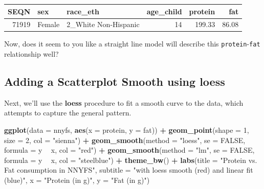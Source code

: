 \documentclass[
]{book}
\newenvironment{Shaded}{\begin{snugshade}}{\end{snugshade}}
\newcommand{\DataTypeTok}[1]{\textcolor[rgb]{0.13,0.29,0.53}{#1}}
\newcommand{\DecValTok}[1]{\textcolor[rgb]{0.00,0.00,0.81}{#1}}
\newcommand{\KeywordTok}[1]{\textcolor[rgb]{0.13,0.29,0.53}{\textbf{#1}}}
\newcommand{\NormalTok}[1]{#1}
\newcommand{\OperatorTok}[1]{\textcolor[rgb]{0.81,0.36,0.00}{\textbf{#1}}}
\newcommand{\OtherTok}[1]{\textcolor[rgb]{0.56,0.35,0.01}{#1}}
\newcommand{\StringTok}[1]{\textcolor[rgb]{0.31,0.60,0.02}{#1}}
\begin{document}
\begin{Shaded}
\end{Shaded}

\begin{tabular}{r|l|l|r|r|r}
\hline
SEQN & sex & race\_eth & age\_child & protein & fat\\
\hline
71919 & Female & 2\_White Non-Hispanic & 14 & 199.33 & 86.08\\
\hline
\end{tabular}

Now, does it seem to you like a straight line model will describe this \texttt{protein}-\texttt{fat} relationship well?

\hypertarget{adding-a-scatterplot-smooth-using-loess}{%
\subsection{Adding a Scatterplot Smooth using loess}\label{adding-a-scatterplot-smooth-using-loess}}

Next, we'll use the \textbf{loess} procedure to fit a smooth curve to the data, which attempts to capture the general pattern.

\begin{Shaded}
\begin{Highlighting}[]
\KeywordTok{ggplot}\NormalTok{(}\DataTypeTok{data =}\NormalTok{ nnyfs, }\KeywordTok{aes}\NormalTok{(}\DataTypeTok{x =}\NormalTok{ protein, }\DataTypeTok{y =}\NormalTok{ fat)) }\OperatorTok{+}
\StringTok{    }\KeywordTok{geom_point}\NormalTok{(}\DataTypeTok{shape =} \DecValTok{1}\NormalTok{, }\DataTypeTok{size =} \DecValTok{2}\NormalTok{, }\DataTypeTok{col =} \StringTok{"sienna"}\NormalTok{) }\OperatorTok{+}
\StringTok{    }\KeywordTok{geom_smooth}\NormalTok{(}\DataTypeTok{method =} \StringTok{"loess"}\NormalTok{, }\DataTypeTok{se =} \OtherTok{FALSE}\NormalTok{, }\DataTypeTok{formula =}\NormalTok{ y }\OperatorTok{~}\StringTok{ }\NormalTok{x, }\DataTypeTok{col =} \StringTok{"red"}\NormalTok{) }\OperatorTok{+}
\StringTok{    }\KeywordTok{geom_smooth}\NormalTok{(}\DataTypeTok{method =} \StringTok{"lm"}\NormalTok{, }\DataTypeTok{se =} \OtherTok{FALSE}\NormalTok{, }\DataTypeTok{formula =}\NormalTok{ y }\OperatorTok{~}\StringTok{ }\NormalTok{x, }\DataTypeTok{col =} \StringTok{"steelblue"}\NormalTok{) }\OperatorTok{+}
\StringTok{    }\KeywordTok{theme_bw}\NormalTok{() }\OperatorTok{+}
\StringTok{    }\KeywordTok{labs}\NormalTok{(}\DataTypeTok{title =} \StringTok{"Protein vs. Fat consumption in NNYFS"}\NormalTok{,}
         \DataTypeTok{subtitle =} \StringTok{"with loess smooth (red) and linear fit (blue)"}\NormalTok{,}
         \DataTypeTok{x =} \StringTok{"Protein (in g)"}\NormalTok{, }\DataTypeTok{y =} \StringTok{"Fat (in g)"}\NormalTok{)}
\end{Highlighting}
\end{Shaded}
\end{document}
